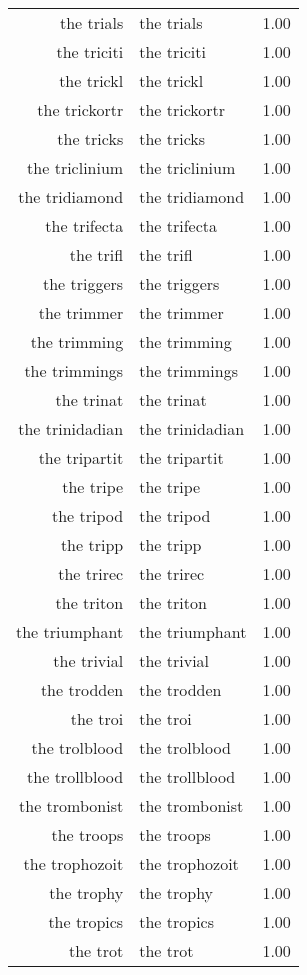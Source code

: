 \begin{table}[ht]
\begin{tabular}{rlr}
  the trials & the trials & 1.00 \\ 
  the triciti & the triciti & 1.00 \\ 
  the trickl & the trickl & 1.00 \\ 
  the trickortr & the trickortr & 1.00 \\ 
  the tricks & the tricks & 1.00 \\ 
  the triclinium & the triclinium & 1.00 \\ 
  the tridiamond & the tridiamond & 1.00 \\ 
  the trifecta & the trifecta & 1.00 \\ 
  the trifl & the trifl & 1.00 \\ 
  the triggers & the triggers & 1.00 \\ 
  the trimmer & the trimmer & 1.00 \\ 
  the trimming & the trimming & 1.00 \\ 
  the trimmings & the trimmings & 1.00 \\ 
  the trinat & the trinat & 1.00 \\ 
  the trinidadian & the trinidadian & 1.00 \\ 
  the tripartit & the tripartit & 1.00 \\ 
  the tripe & the tripe & 1.00 \\ 
  the tripod & the tripod & 1.00 \\ 
  the tripp & the tripp & 1.00 \\ 
  the trirec & the trirec & 1.00 \\ 
  the triton & the triton & 1.00 \\ 
  the triumphant & the triumphant & 1.00 \\ 
  the trivial & the trivial & 1.00 \\ 
  the trodden & the trodden & 1.00 \\ 
  the troi & the troi & 1.00 \\ 
  the trolblood & the trolblood & 1.00 \\ 
  the trollblood & the trollblood & 1.00 \\ 
  the trombonist & the trombonist & 1.00 \\ 
  the troops & the troops & 1.00 \\ 
  the trophozoit & the trophozoit & 1.00 \\ 
  the trophy & the trophy & 1.00 \\ 
  the tropics & the tropics & 1.00 \\ 
  the trot & the trot & 1.00 \\ 

\end{tabular}
\end{table}
